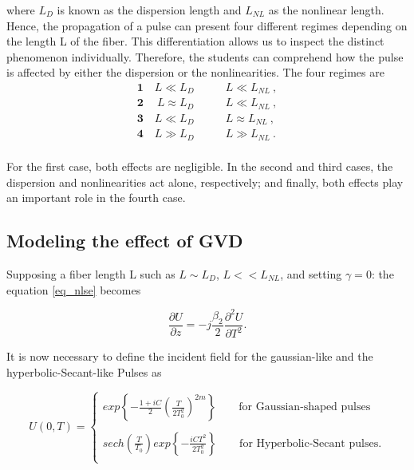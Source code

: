         where $L_D$ is known as the dispersion length and $L_{NL}$ as the nonlinear length. Hence, the propagation of a pulse can present four different regimes depending on the length L of the fiber. This differentiation allows us to inspect the distinct phenomenon individually. Therefore, the students can comprehend how the pulse is affected by either the dispersion or the nonlinearities. The four regimes are 
        \begin{equation}
            \begin{aligned}\label{eq_lregimes}
               \mathbf{1} \quad L \ll L_D \quad & \quad L \ll  L_{NL} \ , \\
              \mathbf{2} \ \quad L \approx L_D \quad & \quad L \ll  L_{NL} \ , \\
               \mathbf{3} \quad L \ll L_D \quad & \quad L \approx  L_{NL} \ , \\
               \mathbf{4} \quad L \gg L_D \quad & \quad L \gg  L_{NL} \ . \\
            \end{aligned}
        \end{equation} 
        
        For the first case, both effects are negligible. In the second and third cases, the dispersion and nonlinearities act alone, respectively; and finally, both effects play an important role in the fourth case.
        
        \subsection{Modeling the effect of GVD}
   
    
        
        Supposing a fiber length L such as $L \sim L_D$, $L << L_{NL}$, and setting $\gamma = 0$:  the equation \eqref{eq_nlse} becomes 
        
         \begin{equation}\label{eq_ugvd}
            \frac{\partial U}{\partial z} = -j\frac{\beta_2}{2}\frac{\partial^2U}{\partial T^2}.
        \end{equation}

        It is now necessary to define the incident field for the gaussian-like and the hyperbolic-Secant-like Pulses as 
            
        \begin{equation}\label{eq_u0t}
            U(0,T) = 
            \begin{cases}
                exp \left\{ -\frac{1+iC}{2} \left(\frac{T}{2T^2_0} \right)^{2m} \right\} \qquad \text{for Gaussian-shaped pulses}  \\
                \ \\
                sech\left( \frac{T}{T_0}\right) exp \left\{ -\frac{iCT^2}{2T^2_0} \right\} \qquad \text{for Hyperbolic-Secant pulses}.  \\
            \end{cases}
        \end{equation}
        
